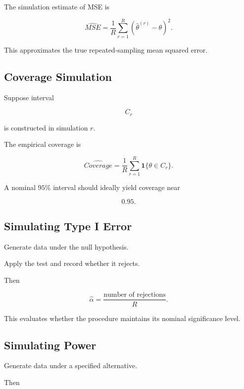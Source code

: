 The simulation estimate of MSE is

\[
\boxed{
\widehat{MSE}
=
\frac1R
\sum_{r=1}^{R}
\left(
\widehat{\theta}^{(r)}
-
\theta
\right)^2.
}
\]

This approximates the true repeated-sampling mean squared error.

\subsection{Coverage Simulation}
\label{subsec:coverage-simulation}

Suppose interval

\[
C_r
\]

is constructed in simulation \(r\).

The empirical coverage is

\[
\boxed{
\widehat{Coverage}
=
\frac1R
\sum_{r=1}^{R}
\mathbf{1}
\{
\theta\in C_r
\}.
}
\]

A nominal \(95\%\) interval should ideally yield coverage near

\[
\boxed{
0.95.
}
\]

\subsection{Simulating Type I Error}
\label{subsec:simulation-type-i}

Generate data under the null hypothesis.

Apply the test and record whether it rejects.

Then

\[
\boxed{
\widehat{\alpha}
=
\frac{
\text{number of rejections}
}{
R
}.
}
\]

This evaluates whether the procedure maintains its nominal significance
level.

\subsection{Simulating Power}
\label{subsec:simulation-power}

Generate data under a specified alternative.

Then

